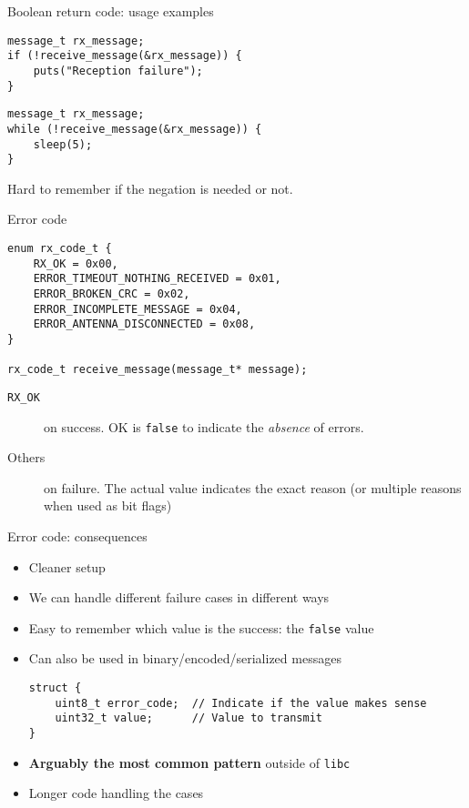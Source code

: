 \documentclass[aspectratio=169,14pt]{beamer}
\begin{document}
\begin{frame}[fragile]{Boolean return code: usage examples}
\begin{lstlisting}[style=cstyle]
message_t rx_message;
if (!receive_message(&rx_message)) {
    puts("Reception failure");
}
\end{lstlisting}

\begin{lstlisting}[style=cstyle]
message_t rx_message;
while (!receive_message(&rx_message)) {
    sleep(5);
}
\end{lstlisting}

Hard to remember if the negation is needed or not.
\end{frame}



\begin{frame}[fragile]{Error code}
\begin{lstlisting}[style=cstyle]
enum rx_code_t {
    RX_OK = 0x00,
    ERROR_TIMEOUT_NOTHING_RECEIVED = 0x01,
    ERROR_BROKEN_CRC = 0x02,
    ERROR_INCOMPLETE_MESSAGE = 0x04,
    ERROR_ANTENNA_DISCONNECTED = 0x08,
}

rx_code_t receive_message(message_t* message);
\end{lstlisting}

\begin{description}
    \item[\texttt{RX\_OK}] on success. OK is \texttt{false} to indicate the \textit{absence} of errors.
    \item[Others] on failure. The actual value indicates the exact reason (or multiple reasons when used as bit flags)
\end{description}
\end{frame}



\begin{frame}[fragile]{Error code: consequences}
\begin{itemize}
    \item[\good] Cleaner setup
    \item[\good] We can handle different failure cases in different ways
    \item[\good] Easy to remember which value is the success: the \texttt{false} value
    \item[\good] Can also be used in binary/encoded/serialized messages
                 \begin{small}
\begin{lstlisting}[style=cstyle]
struct {
    uint8_t error_code;  // Indicate if the value makes sense
    uint32_t value;      // Value to transmit
}
\end{lstlisting}
                 \end{small}
    \item[\good] \textbf{Arguably the most common pattern} outside of \texttt{libc}
    \item[\bad] Longer code handling the cases
\end{itemize}
\end{frame}
\end{document}
